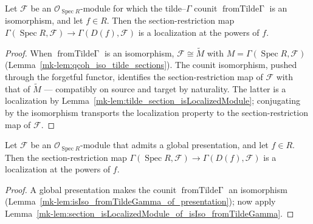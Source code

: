 \begin{lemma}\label{mk-lem:section_isLocalizedModule_of_isIso_fromTildeGamma}
  \leanok

  Let \(\mathcal{F}\) be an \(\mathcal{O}_{\operatorname{Spec} R}\)-module for which the
  tilde--\(\Gamma\) counit \(\operatorname{fromTilde\Gamma}\) is an isomorphism, and let \(f \in R\).
  Then the section-restriction map \(\Gamma(\operatorname{Spec} R, \mathcal{F}) \to \Gamma(D(f),
  \mathcal{F})\) is a localization at the powers of \(f\).
\end{lemma}
\begin{proof}
  \leanok
  When \(\operatorname{fromTilde\Gamma}\) is an isomorphism, \(\mathcal{F} \cong \widetilde{M}\) with
  \(M = \Gamma(\operatorname{Spec} R, \mathcal{F})\) (Lemma~\ref{mk-lem:qcoh_iso_tilde_sections}). The
  counit isomorphism, pushed through the forgetful functor, identifies the section-restriction map of
  \(\mathcal{F}\) with that of \(\widetilde{M}\) — compatibly on source and target by naturality. The
  latter is a localization by Lemma~\ref{mk-lem:tilde_section_isLocalizedModule}; conjugating by the
  isomorphism transports the localization property to the section-restriction map of \(\mathcal{F}\).
\end{proof}

\begin{lemma}\label{mk-lem:section_isLocalizedModule_of_presentation}
  \leanok

  Let \(\mathcal{F}\) be an \(\mathcal{O}_{\operatorname{Spec} R}\)-module that admits a global
  presentation, and let \(f \in R\). Then the section-restriction map
  \(\Gamma(\operatorname{Spec} R, \mathcal{F}) \to \Gamma(D(f), \mathcal{F})\) is a localization at the
  powers of \(f\).
\end{lemma}
\begin{proof}
  \leanok
    A global presentation makes the counit \(\operatorname{fromTilde\Gamma}\) an isomorphism
  (Lemma~\ref{mk-lem:isIso_fromTildeGamma_of_presentation}); now apply
  Lemma~\ref{mk-lem:section_isLocalizedModule_of_isIso_fromTildeGamma}.
\end{proof}

